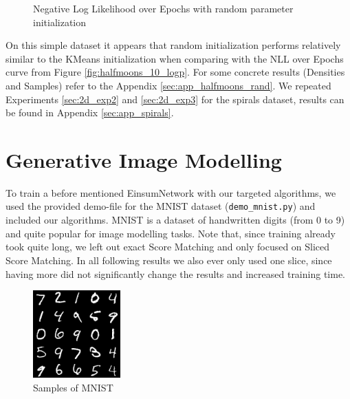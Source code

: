 \begin{figure}[H]
    \centering
    \caption{Negative Log Likelihood over Epochs with random parameter initialization}
    \label{fig:halfmoons_10_random_logp}
\end{figure}

On this simple dataset it appears that random initialization performs relatively similar to the KMeans initialization when comparing with the NLL over Epochs curve from Figure \ref{fig:halfmoons_10_logp}. For some concrete results (Densities and Samples) refer to the Appendix \ref{sec:app_halfmoons_rand}.
We repeated Experiments \ref{sec:2d_exp2} and \ref{sec:2d_exp3} for the spirals dataset, results can be found in Appendix \ref{sec:app_spirals}.

\section{Generative Image Modelling}
\label{sec:exp_image}

To train a before mentioned EinsumNetwork \cite{einsum} with our targeted algorithms, we used the provided demo-file for the MNIST \cite{mnist} dataset (\texttt{demo\_mnist.py}) and included 
our algorithms. MNIST is a dataset of handwritten digits (from 0 to 9) and quite popular for image modelling tasks.
Note that, since training already took quite long, we left out exact Score Matching and only focused on Sliced Score Matching. 
In all following results we also ever only used one slice, since having more did not significantly 
change the results and increased training time. \\

\begin{figure}[H]
    \centering
    \includegraphics[width=0.3\textwidth]{figures/einsum/mnist/[]_ground_truth.png}
    \caption{Samples of MNIST}
\end{figure}


